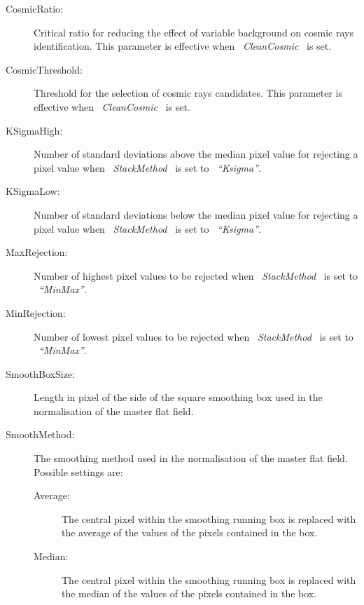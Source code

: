 \begin{description}
\begin{description}
\end{description}

\item [CosmicRatio:]    Critical ratio for reducing the effect of variable
                        background on cosmic rays identification. This 
                        parameter is effective when \ {\it CleanCosmic} 
                        \ is set.

\item [CosmicThreshold:]  Threshold for the selection of cosmic rays
                        candidates. This parameter is effective when 
                        \ {\it CleanCosmic} \ is set.

\item [KSigmaHigh:]  Number of standard deviations above the median pixel
                    value for rejecting a pixel value
                    when \ {\it StackMethod} \ is set to \ {\it ``Ksigma''}.

\item [KSigmaLow:]  Number of standard deviations below the median pixel
                    value for rejecting a pixel value
                    when \ {\it StackMethod} \ is set to \ {\it ``Ksigma''}.

\item [MaxRejection:]  Number of highest pixel values to be rejected 
                       when \ {\it StackMethod} \ is set to \ {\it ``MinMax''}.

\item [MinRejection:]  Number of lowest pixel values to be rejected 
                       when \ {\it StackMethod} \ is set to \ {\it ``MinMax''}.

\item [SmoothBoxSize:] Length in pixel of the side of the square smoothing 
                       box used in the normalisation of the master flat
                       field.

\item [SmoothMethod:]  The smoothing method used in the normalisation of the
                       master flat field. Possible settings are:

\begin{description}

  \item [Average:] The central pixel within the smoothing running box
                  is replaced with the average of the values of the
                  pixels contained in the box.

  \item [Median:] The central pixel within the smoothing running box
                  is replaced with the median of the values of the
                  pixels contained in the box.


\end{description}
\end{description}
